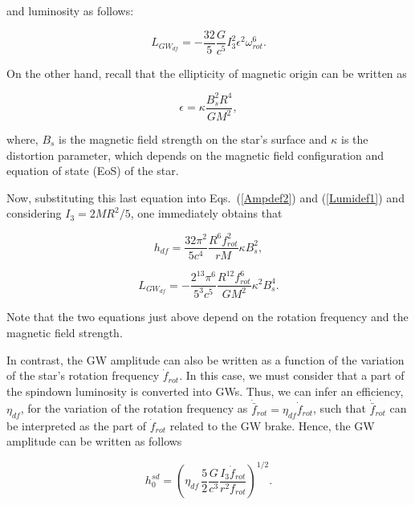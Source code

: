 \documentclass{ws-procs961x669}            %
\begin{document}
\noindent and luminosity as follows: 

 \begin{equation}
   L_{GW_{df}} = - \frac{32}{5} \frac{G}{c^{5}} I_{3}^{2} \epsilon^{2} \omega_{rot}^{6}.
\label{Lumidef1}
\end{equation}

On the other hand, recall that the ellipticity of magnetic origin can be written as \cite{2000A&A...356..234K,2006A&A...447....1R}

\begin{equation}
\epsilon = \kappa \frac{B_{s}^{2} R^{4}}{G M^{2}},
    \label{excentridade}
\end{equation}

\noindent where, $B_{s}$ is the magnetic field strength on the star’s surface and $\kappa$ is the distortion parameter, which depends on the magnetic field configuration and equation of state (EoS) of the star.

Now, substituting this last equation into Eqs.~(\ref{Ampdef2}) and (\ref{Lumidef1}) and considering $I_3 = 2MR^{2}/5 $, one immediately obtains that

\begin{equation}
   h_{df} = \frac{32 \pi^{2} }{5 c^{4}}  \frac{R^{6} f_{rot}^{2}}{r M} \kappa B_{s}^{2},
\label{Ampdef3}
\end{equation}

\begin{equation}
   L_{GW_{df}} = - \frac{2^{13} \pi^{6} }{5^3 c^{5}} \frac{ R^{12} f_{rot}^{6}}{G M^{2}}\kappa^2 B_{s}^{4}.
\label{Lumidef2}
\end{equation}

Note that the two equations just above depend on the rotation frequency and the magnetic field strength.

In contrast, the GW amplitude can also be written as a function of the variation of the star's rotation frequency $\dot{f}_{rot}$. In this case, we must consider that a part of the spindown luminosity is converted into GWs. Thus, we can infer an efficiency, $\eta_{df}$, for the variation of the rotation frequency as $\dot{\bar{f}}_{rot} = \eta_{df} \dot{f}_{rot}$, such that $\dot{\bar{f}}_{rot}$ can be interpreted as the part of $\dot{f}_{rot}$ related to the GW brake. Hence, the GW amplitude can be written as follows

\begin{equation}
  h_{0}^{sd} = \left ( \eta_{df} \, \frac{5}{2} \frac{G}{c^{3}}  \frac{I_{3} \dot{f}_{rot}}{r^{2} f_{rot}} \right )^{1/2}.
    \label{Ampsp2}
 \end{equation}
\end{document}
